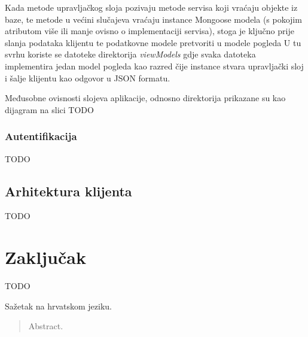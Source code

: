 \documentclass[times, utf8, diplomski, numeric]{fer}
\newcommand{\razmakp}{\vspace{18pt}}
\begin{document}
Kada metode upravljačkog sloja pozivaju metode servisa koji vraćaju objekte iz baze, te metode u većini slučajeva vraćaju instance Mongoose modela (s pokojim atributom više ili manje ovisno o implementaciji servisa), stoga je ključno prije slanja podataka klijentu te podatkovne modele  pretvoriti u modele pogleda 
U tu svrhu koriste se datoteke direktorija \emph{viewModels} gdje svaka datoteka implementira jedan model pogleda kao razred čije instance stvara upravljački sloj i šalje klijentu kao odgovor u JSON formatu.

\razmakp

Međusobne ovisnosti slojeva aplikacije, odnosno direktorija prikazane su kao dijagram na slici TODO

\subsection{Autentifikacija}

TODO

\newpage
\section{Arhitektura klijenta}

TODO



\chapter{Zaključak}

TODO







\begin{sazetak}
Sažetak na hrvatskom jeziku.

\end{sazetak}

\begin{abstract}
Abstract.

\end{abstract}
\end{document}
